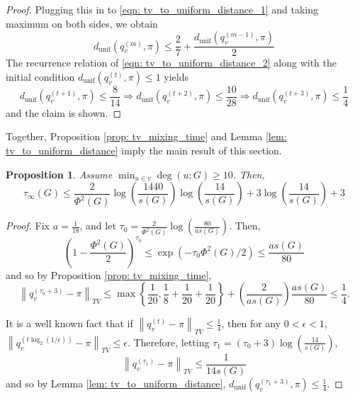 \documentclass{article}
\newcommand{\set}[1]{\left\{#1\right\}}
\newcommand{\norm}[1]{\left\lVert#1\right\rVert}
\newcommand{\1}{\mathbf{1}}
\theoremstyle{aldenthm}
\newtheorem{proposition}{Proposition}
\theoremstyle{aldenrmrk}
\begin{document}
\begin{proof}
	Plugging this in to \eqref{eqn: tv_to_uniform_distance_1} and taking maximum on both sides, we obtain
	\begin{equation}
	d_{\textrm{unif}}(q_v^{(m)}, \pi) \leq \frac{2}{7} + \frac{d_{\textrm{unif}}(q_v^{(m - 1)}, \pi)}{2} \label{eqn: tv_to_uniform_distance_2}
	\end{equation}
	The recurrence relation of \eqref{eqn: tv_to_uniform_distance_2} along with the initial condition $d_{\textrm{unif}}(q_v^{(t)}, \pi) \leq 1$ yields
	\begin{equation*}
	d_{\textrm{unif}}(q_v^{(t + 1)}, \pi) \leq \frac{8}{14} \Rightarrow d_{\textrm{unif}}(q_v^{(t + 2)}, \pi) \leq \frac{10}{28} \Rightarrow  d_{\textrm{unif}}(q_v^{(t + 3)}, \pi) \leq \frac{1}{4}
	\end{equation*}
	and the claim is shown.
\end{proof}

Together, Proposition \ref{prop: tv_mixing_time} and Lemma \ref{lem: tv_to_uniform_distance} imply the main result of this section.

\begin{proposition}
	\label{prop: pointwise_mixing_time}
	Assume $\min_{u \in v} \deg(u; G) \geq 10$. Then,
	\begin{equation*}
	\tau_{\infty}(G) \leq \frac{2}{\Phi^2(G)} \log \left(\frac{1440}{s(G)}\right)\log \left(\frac{14}{s(G)}\right)  + 3 \log \left(\frac{14}{s(G)}\right) + 3
	\end{equation*}
\end{proposition}
\begin{proof}
	Fix $a = \frac{1}{18}$, and let $\tau_0 = \frac{2}{\Phi^2(G)} \log \left(\frac{80}{a s(G)}\right)$. Then,
	\begin{equation*}
	\left(1 - \frac{\Phi^2(G)}{2}\right)^{\tau_0} \leq \exp(- \tau_0\Phi^2(G)/2) \leq \frac{as(G)}{80}
	\end{equation*}
	and so by Proposition \ref{prop: tv_mixing_time},
	\begin{equation*}
	\norm{q_v^{(\tau_0 + 3)} - \pi}_{TV} \leq \max \set{\frac{1}{20}, \frac{1}{8} + \frac{1}{20} + \frac{1}{20}} + \left(\frac{2}{as(G)}\right) \frac{as(G)}{80} \leq \frac{1}{4}.
	\end{equation*}
	
	It is a well known fact \cite{montenegro2002} that if $\norm{q_v^{(t)} - \pi}_{TV} \leq \frac{1}{4}$, then for any $0 < \epsilon < 1$, $\norm{q_v^{(t\log_2(1/\epsilon))} - \pi}_{TV} \leq \epsilon$. Therefore, letting $\tau_1 = (\tau_0 + 3) \log(\frac{14}{s(G)})$, 
	\begin{equation*}
	\norm{q_v^{(\tau_1)} - \pi}_{TV} \leq \frac{1}{14 s(G)}
	\end{equation*}
	and so by Lemma \ref{lem: tv_to_uniform_distance}, $d_{\textrm{unif}}(q_v^{(\tau_1 + 3)}, \pi) \leq \frac{1}{4}$. 
\end{proof}
\end{document}
